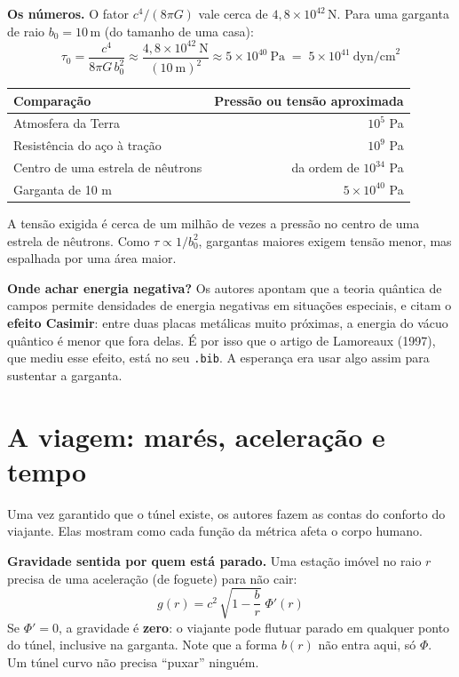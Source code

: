 \documentclass[11pt,a4paper]{article}
\begin{document}
\textbf{Os números.} O fator $c^4/(8\pi G)$ vale cerca de $4{,}8\times 10^{42}$\,N. Para uma garganta de raio
$b_0 = 10$\,m (do tamanho de uma casa):
\begin{equation*}
\tau_0 = \frac{c^4}{8\pi G\, b_0^2} \approx \frac{4{,}8\times 10^{42}\ \text{N}}{(10\ \text{m})^2}
\approx 5\times 10^{40}\ \text{Pa} \;=\; 5\times 10^{41}\ \text{dyn/cm}^2
\end{equation*}

\begin{center}
\begin{tabular}{lr}
\toprule
Comparação & Pressão ou tensão aproximada \\
\midrule
Atmosfera da Terra & $10^{5}$ Pa \\
Resistência do aço à tração & $10^{9}$ Pa \\
Centro de uma estrela de nêutrons & da ordem de $10^{34}$ Pa \\
Garganta de 10 m & $5\times10^{40}$ Pa \\
\bottomrule
\end{tabular}
\end{center}

A tensão exigida é cerca de um milhão de vezes a pressão no centro de uma estrela de nêutrons. Como
$\tau \propto 1/b_0^2$, gargantas maiores exigem tensão menor, mas espalhada por uma área maior.

\textbf{Onde achar energia negativa?} Os autores apontam que a teoria quântica de campos permite densidades de energia
negativas em situações especiais, e citam o \textbf{efeito Casimir}: entre duas placas metálicas muito próximas, a
energia do vácuo quântico é menor que fora delas. É por isso que o artigo de Lamoreaux (1997), que mediu esse efeito,
está no seu \texttt{.bib}. A esperança era usar algo assim para sustentar a garganta.

\section{A viagem: marés, aceleração e tempo}

Uma vez garantido que o túnel existe, os autores fazem as contas do conforto do viajante. Elas mostram como cada
função da métrica afeta o corpo humano.

\textbf{Gravidade sentida por quem está parado.} Uma estação imóvel no raio $r$ precisa de uma aceleração (de
foguete) para não cair:
\begin{equation*}
g(r) = c^2\,\sqrt{1 - \frac{b}{r}}\;\Phi'(r)
\end{equation*}
Se $\Phi' = 0$, a gravidade é \textbf{zero}: o viajante pode flutuar parado em qualquer ponto do túnel, inclusive na
garganta. Note que a forma $b(r)$ não entra aqui, só $\Phi$. Um túnel curvo não precisa ``puxar'' ninguém.
\end{document}
